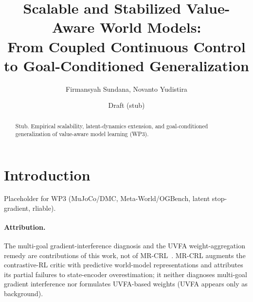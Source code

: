 \documentclass[11pt]{article}
\title{Scalable and Stabilized Value-Aware World Models:\\
  \large From Coupled Continuous Control to Goal-Conditioned Generalization}
\author{Firmansyah Sundana, Novanto Yudistira}
\date{Draft (stub)}
\begin{document}
\maketitle

\begin{abstract}
Stub. Empirical scalability, latent-dynamics extension, and goal-conditioned
generalization of value-aware model learning (WP3).
\end{abstract}

\section{Introduction}
Placeholder for WP3 (MuJoCo/DMC, Meta-World/OGBench, latent stop-gradient, rliable).

\paragraph{Attribution.} The multi-goal gradient-interference diagnosis and the UVFA
weight-aggregation remedy are contributions of this work, not of
MR-CRL~\citep{ali2025mrcrl}. MR-CRL augments the contrastive-RL critic with predictive
world-model representations and attributes its partial failures to state-encoder
overestimation; it neither diagnoses multi-goal gradient interference nor formulates
UVFA-based weights (UVFA appears only as background).



\end{document}

